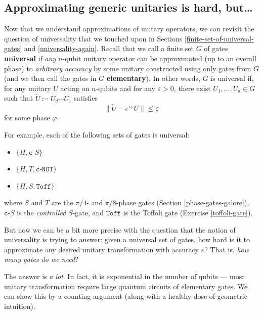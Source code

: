 \documentclass[fleqn,a4paper]{article}
\providecommand{\tightlist}{\setlength{\itemsep}{0pt}\setlength{\parskip}{0pt}}
\theoremstyle{definition}
\theoremstyle{definition}
\theoremstyle{definition}
\theoremstyle{definition}
\theoremstyle{remark}
\begin{document}
\hypertarget{approximating-generic-unitaries-is-hard-but}{%
\subsection{Approximating generic unitaries is hard, but\ldots{}}\label{approximating-generic-unitaries-is-hard-but}}

Now that we understand approximations of unitary operators, we can revisit the question of universality that we touched upon in Sections \ref{finite-set-of-universal-gates} and \ref{universality-again}.
Recall that we call a finite set \(G\) of gates \textbf{universal} if \emph{any} \(n\)-qubit unitary operator can be approximated (up to an overall phase) to \emph{arbitrary accuracy} by some unitary constructed using only gates from \(G\) (and we then call the gates in \(G\) \textbf{elementary}).
In other words, \(G\) is universal if, for any unitary \(U\) acting on \(n\)-qubits and for any \(\varepsilon>0\), there exist \(U_1,\ldots,U_d\in G\) such that \(\widetilde{U}\coloneqq U_d\cdots U_1\) satisfies
\[
  \|\widetilde{U}-e^{i\varphi}U\|\leqslant\varepsilon
\]
for some phase \(\varphi\).

For example, each of the following sets of gates is universal:

\begin{itemize}
\tightlist
\item
  \(\{H,\texttt{c-}S\}\)
\item
  \(\{H,T,\texttt{c-NOT}\}\)
\item
  \(\{H,S,\texttt{Toff}\}\)
\end{itemize}

where \(S\) and \(T\) are the \(\pi/4\)- and \(\pi/8\)-phase gates (Section \ref{phase-gates-galore}), \(\texttt{c-}S\) is the \emph{controlled} \(S\)-gate, and \(\texttt{Toff}\) is the Toffoli gate (Exercise \ref{toffoli-gate}).

But now we can be a bit more precise with the question that the notion of universality is trying to answer: given a universal set of gates, how hard is it to approximate any desired unitary transformation with accuracy \(\varepsilon\)?
That is, \emph{how many gates do we need}?

The answer is \emph{a lot}.
In fact, it is exponential in the number of qubits --- most unitary transformation require large quantum circuits of elementary gates.
We can show this by a counting argument (along with a healthy dose of geometric intuition).
\end{document}
